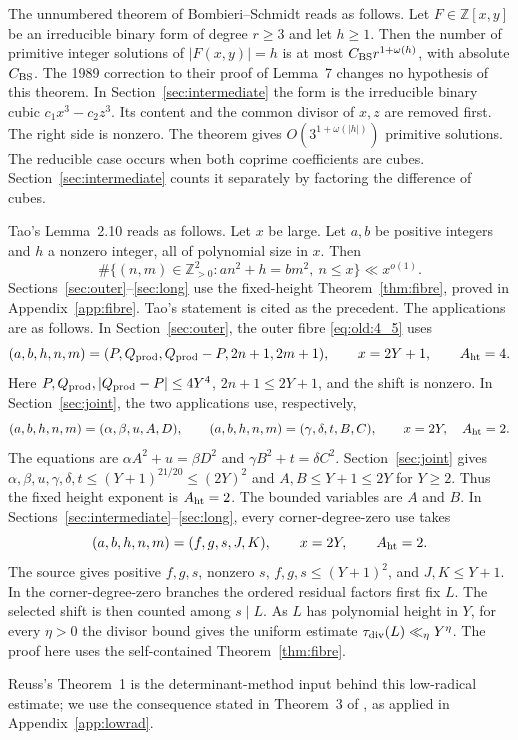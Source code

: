 The unnumbered theorem of Bombieri--Schmidt \cite[pp.~69--70]{BS1987} reads as follows. Let
\(F\in\mathbb Z[x,y]\) be an irreducible binary form of degree
\(r\ge3\) and let \(h\ge1\). Then the number of primitive integer solutions of
\(|F(x,y)|=h\) is at most \(C_{\rm BS}r^{1+\omega(h)}\), with absolute
\(C_{\rm BS}\). The 1989 correction to their proof of Lemma~7
\cite{BS1989} changes no
hypothesis of this theorem. In Section~\ref{sec:intermediate} the form is the irreducible
binary cubic \(c_1x^3-c_2z^3\). Its content and the
common divisor of \(x,z\) are removed first. The right side is nonzero. The theorem gives
\(O(3^{1+\omega(|h|)})\) primitive solutions. The reducible case
occurs when both coprime coefficients are cubes. Section~\ref{sec:intermediate} counts it
separately by factoring the difference of cubes.

Tao's Lemma~2.10 \cite[Lemma~2.10]{Tao} reads as follows. Let \(x\) be large. Let \(a,b\) be
positive integers and \(h\) a nonzero integer, all of polynomial size in
\(x\). Then
\[
 \#\{(n,m)\in\mathbb Z_{>0}^2:an^2+h=bm^2,\ n\le x\}
 \ll x^{o(1)}.
\]
Sections~\ref{sec:outer}--\ref{sec:long} use the fixed-height Theorem~\ref{thm:fibre},
proved in Appendix~\ref{app:fibre}. Tao's statement is cited as the
precedent. The applications are as follows. In Section~\ref{sec:outer}, the
outer fibre \eqref{eq:old:4_5} uses
\[
(a,b,h,n,m)=(P,Q_{\rm prod},Q_{\rm prod}-P,2n+1,2m+1),
\qquad x=2Y+1,\qquad A_{\rm ht}=4.
\]
Here \(P,Q_{\rm prod},|Q_{\rm prod}-P|\le4Y^4\),
\(2n+1\le2Y+1\), and the shift is nonzero.
In Section~\ref{sec:joint}, the two applications use, respectively,
\[
(a,b,h,n,m)=(\alpha,\beta,u,A,D),\qquad
(a,b,h,n,m)=(\gamma,\delta,t,B,C),\qquad x=2Y,\quad A_{\rm ht}=2.
\]
The equations are \(\alpha A^2+u=\beta D^2\) and
\(\gamma B^2+t=\delta C^2\). Section~\ref{sec:joint} gives
\(\alpha,\beta,u,\gamma,\delta,t\le(Y+1)^{21/20}\le(2Y)^2\) and
\(A,B\le Y+1\le2Y\) for \(Y\ge2\). Thus the fixed height exponent is
\(A_{\rm ht}=2\). The bounded variables are \(A\) and \(B\).
In Sections~\ref{sec:intermediate}--\ref{sec:long}, every corner-degree-zero use takes
\[
(a,b,h,n,m)=(f,g,s,J,K),\qquad x=2Y,\qquad A_{\rm ht}=2.
\]
The source gives positive \(f,g,s\), nonzero \(s\),
\(f,g,s\le(Y+1)^2\), and \(J,K\le Y+1\). In the corner-degree-zero
branches the ordered residual factors first fix \(L\). The selected
shift is then counted among \(s\mid L\). As \(L\) has polynomial
height in \(Y\), for every \(\eta>0\) the divisor bound gives the
uniform estimate \(\tau_{\mathrm{div}}(L)\ll_\eta Y^\eta\). The proof here uses the self-contained
Theorem~\ref{thm:fibre}.

Reuss's Theorem~1 is the determinant-method input behind this low-radical
estimate; we use the consequence stated in Theorem~3 of \cite{Paper1},
as applied in Appendix~\ref{app:lowrad}.
